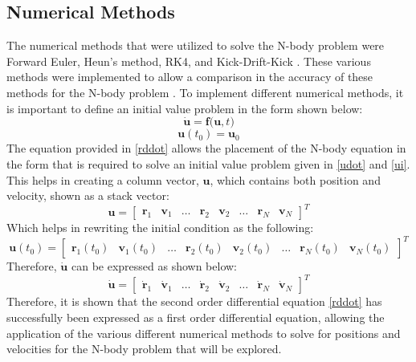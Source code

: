 \documentclass[conf]{new-aiaa}
\begin{document}
    \subsection{Numerical Methods}
    The numerical methods that were utilized to solve the N-body problem were Forward Euler, Heun's method, RK4, and Kick-Drift-Kick \cite{LecOSM}. These various methods were implemented to allow a comparison in the accuracy of these methods for the N-body problem \cite{Bill}. To implement different numerical methods, it is important to define an initial value problem in the form shown below:
    \begin{equation}
        \bm{\dot{u}} = \bm{f(u},t)
        \label{udot}
    \end{equation}
    \begin{equation}
        \bm{u}(t_{0}) = \bm{u}_{0}
        \label{ui}
    \end{equation}
    The equation provided in \eqref{rddot} allows the placement of the N-body equation in the form that is required to solve an initial value problem given in \eqref{udot} and \eqref{ui}. This helps in creating a column vector, $\boldsymbol{u}$, which contains both position and velocity, shown as a stack vector:
    \begin{equation}
        \boldsymbol{u} = \begin{bmatrix}
        \bm{r}_1 & \bm{v}_1 & \hdots & \bm{r}_2 & \bm{v}_2 & \hdots & \bm{r}_N & \bm{v}_N
        \end{bmatrix}^T
        \label{u}
    \end{equation}
    Which helps in rewriting the initial condition as the following:
    \begin{equation}
        \boldsymbol{u}(t_0) = \begin{bmatrix}
        \bm{r}_1(t_0) & \bm{v}_1(t_0) & \hdots & \bm{r}_2(t_0) & \bm{v}_2(t_0)  & \hdots & \bm{r}_N(t_0) & \bm{v}_N(t_0)
        \end{bmatrix}^T
        \label{u}
    \end{equation}
    Therefore, $\bm{\dot{u}}$ can be expressed as shown below:
    \begin{equation}
        \bm{\dot{u}} = \begin{bmatrix}
        \bm{\dot{r}}_1 & \bm{\dot{v}}_1 & \hdots & \bm{\dot{r}}_2 & \bm{\dot{v}}_2  & \hdots & \bm{\dot{r}}_N& \bm{\dot{v}}_N
        \end{bmatrix}^T
    \end{equation}
    Therefore, it is shown that the second order differential equation \eqref{rddot} has successfully been expressed as a first order differential equation, allowing the application of the various different numerical methods to solve for positions and velocities for the N-body problem that will be explored. 
\end{document}
